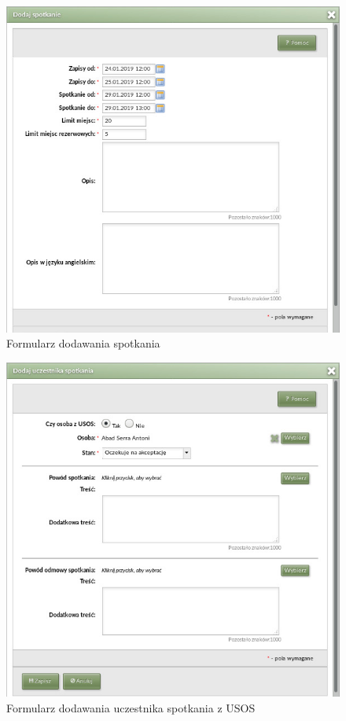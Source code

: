\documentclass[licencjacka]{pracamgr}
\begin{document}
\begin{figure}[!]
  \includegraphics[width=\linewidth]{formularz_spotkan.jpg}
  \caption{Formularz dodawania spotkania}
  \label{fig:kalenformspotkadm}
\end{figure}

\begin{figure}[!]
  \includegraphics[width=\linewidth]{formularz_uczestnikow_USOS.jpg}
  \caption{Formularz dodawania uczestnika spotkania z USOS}
  \label{fig:kalenformuczusosadm}
\end{figure}
\end{document}
